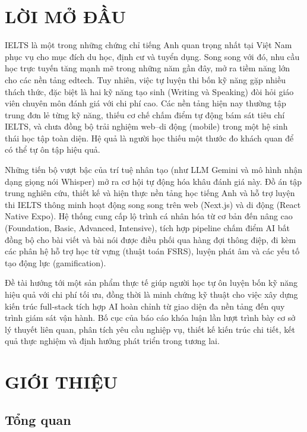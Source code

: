 \chapter*{LỜI MỞ ĐẦU}
\thispagestyle{mainstyle}
IELTS là một trong những chứng chỉ tiếng Anh quan trọng nhất tại Việt Nam phục vụ cho mục đích du học, định cư và tuyển dụng. Song song với đó, nhu cầu học trực tuyến tăng mạnh mẽ trong những năm gần đây, mở ra tiềm năng lớn cho các nền tảng edtech. Tuy nhiên, việc tự luyện thi bốn kỹ năng gặp nhiều thách thức, đặc biệt là hai kỹ năng tạo sinh (Writing và Speaking) đòi hỏi giáo viên chuyên môn đánh giá với chi phí cao. Các nền tảng hiện nay thường tập trung đơn lẻ từng kỹ năng, thiếu cơ chế chấm điểm tự động bám sát tiêu chí IELTS, và chưa đồng bộ trải nghiệm web--di động (mobile) trong một hệ sinh thái học tập toàn diện. Hệ quả là người học thiếu một thước đo khách quan để có thể tự ôn tập hiệu quả.

Những tiến bộ vượt bậc của trí tuệ nhân tạo (như LLM Gemini và mô hình nhận dạng giọng nói Whisper) mở ra cơ hội tự động hóa khâu đánh giá này. Đồ án tập trung nghiên cứu, thiết kế và hiện thực nền tảng học tiếng Anh và hỗ trợ luyện thi IELTS thông minh hoạt động song song trên web (Next.js) và di động (React Native Expo). Hệ thống cung cấp lộ trình cá nhân hóa từ cơ bản đến nâng cao (Foundation, Basic, Advanced, Intensive), tích hợp pipeline chấm điểm AI bất đồng bộ cho bài viết và bài nói được điều phối qua hàng đợi thông điệp, đi kèm các phân hệ hỗ trợ học từ vựng (thuật toán FSRS), luyện phát âm và các yếu tố tạo động lực (gamification).

Đề tài hướng tới một sản phẩm thực tế giúp người học tự ôn luyện bốn kỹ năng hiệu quả với chi phí tối ưu, đồng thời là minh chứng kỹ thuật cho việc xây dựng kiến trúc full-stack tích hợp AI hoàn chỉnh từ giao diện đa nền tảng đến quy trình giám sát vận hành. Bố cục của báo cáo khóa luận lần lượt trình bày cơ sở lý thuyết liên quan, phân tích yêu cầu nghiệp vụ, thiết kế kiến trúc chi tiết, kết quả thực nghiệm và định hướng phát triển trong tương lai.

\chapter{GIỚI THIỆU}
\thispagestyle{mainstyle}

\section{Tổng quan}

